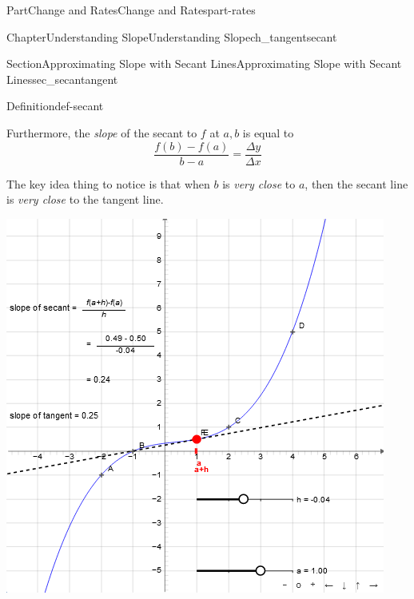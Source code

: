 \documentclass{tufte-book}
\numberwithin{equation}{chapter}
\begin{document}
\begin{partptx}{Part}{Change and Rates}{}{Change and Rates}{}{}{part-rates}
\begin{chapterptx}{Chapter}{Understanding Slope}{}{Understanding Slope}{}{}{ch_tangentsecant}
\begin{sectionptx}{Section}{Approximating Slope with Secant Lines}{}{Approximating Slope with Secant Lines}{}{}{sec_secantangent}
\begin{definition}{Definition}{}{def-secant}
\begin{sidebyside}{2}{0}{0}{0}
\begin{sbspanel}{0.5}
{\begin{tikzpicture}
\end{tikzpicture}
}%
\end{sbspanel}%
\end{sidebyside}%
\par
Furthermore, the \emph{slope} of the secant to \(f\) at \(a,b\) is equal to%
\begin{equation*}
\dfrac{f(b)-f(a)}{b-a} = \dfrac{\Delta y}{\Delta x}
\end{equation*}
%
\end{definition}
The key idea thing to notice is that when \(b\) is \emph{very close} to \(a\), then the secant line is \emph{very close} to the tangent line.%
\begin{sidebyside}{2}{0.075}{0.075}{0.17}%
\begin{sbspanel}{0.47}%
\includegraphics[width=\linewidth]{external/jsxgraph-derivative-limit-of-secant.png}
\end{sbspanel}%
\begin{sbspanel}{0.21}%

\end{sbspanel}
\end{sidebyside}
\end{sectionptx}
\end{chapterptx}
\end{partptx}
\end{document}
